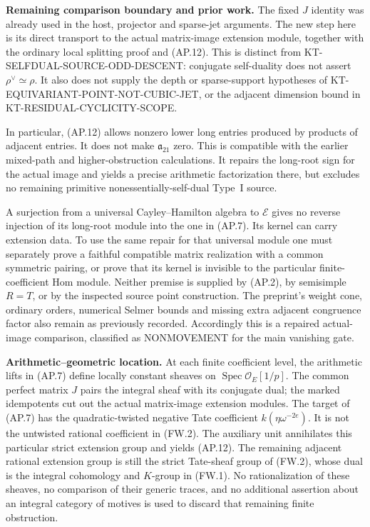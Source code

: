 \documentclass[11pt,a4paper]{article}
\theoremstyle{definition}
\renewcommand{\paragraph}[1]{\par\smallskip\noindent\textbf{#1}\quad\ignorespaces}
\begin{document}
\paragraph{Remaining comparison boundary and prior work.}
The fixed $J$ identity was already used in the host, projector
and sparse-jet arguments.  The new step here is its direct
transport to the actual matrix-image extension module,
together with the ordinary local splitting proof and (AP.12).
This is distinct from KT-SELFDUAL-SOURCE-ODD-DESCENT:
conjugate self-duality does not assert $\rho^\vee\simeq\rho$.
It also does not supply the depth or sparse-support hypotheses
of KT-EQUIVARIANT-POINT-NOT-CUBIC-JET, or the adjacent
dimension bound in KT-RESIDUAL-CYCLICITY-SCOPE.

In particular, (AP.12) allows nonzero lower long entries
produced by products of adjacent entries.  It does not make
$\mathfrak a_{21}$ zero.  This is compatible with the earlier
mixed-path and higher-obstruction calculations.  It repairs
the long-root sign for the actual image and yields a precise
arithmetic factorization there, but excludes no remaining
primitive nonessentially-self-dual Type~I source.

A surjection from a universal Cayley--Hamilton algebra to
$\mathcal E$ gives no reverse injection of its long-root
module into the one in (AP.7).  Its kernel can carry
extension data.  To use the same repair for that universal
module one must separately prove a faithful compatible
matrix realization with a common symmetric pairing, or
prove that its kernel is invisible to the particular
finite-coefficient Hom module.  Neither premise is supplied
by (AP.2), by semisimple $R=T$, or by the inspected source
point construction.  The preprint's weight cone, ordinary
orders, numerical Selmer bounds and missing extra adjacent
congruence factor also remain as previously recorded.
Accordingly this is a repaired actual-image comparison,
classified as NONMOVEMENT for the main vanishing gate.

\paragraph{Arithmetic--geometric location.}
At each finite coefficient level, the arithmetic lifts in (AP.7)
define locally constant sheaves on
$\operatorname{Spec}\mathcal O_E[1/p]$.
The common perfect matrix $J$ pairs the integral sheaf with
its conjugate dual; the marked idempotents cut out the actual
matrix-image extension modules.  The target of (AP.7) has the
quadratic-twisted negative Tate coefficient
$k(\eta\omega^{-2e})$.  It is not the untwisted rational
coefficient in (FW.2).  The auxiliary unit annihilates this
particular strict extension group and yields (AP.12).
The remaining adjacent rational extension group is still the
strict Tate-sheaf group of (FW.2), whose dual is the integral
cohomology and $K$-group in (FW.1).  No rationalization of
these sheaves, no comparison of their generic traces, and
no additional assertion about an integral category of motives
is used to discard that remaining finite obstruction.
\end{document}
